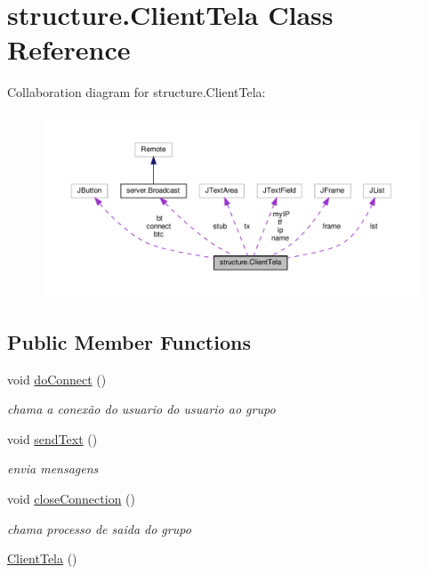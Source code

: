 \hypertarget{classstructure_1_1_client_tela}{}\section{structure.\+Client\+Tela Class Reference}
\label{classstructure_1_1_client_tela}


Collaboration diagram for structure.\+Client\+Tela\+:
\nopagebreak
\begin{figure}[H]
\begin{center}
\leavevmode
\includegraphics[width=350pt]{classstructure_1_1_client_tela__coll__graph}
\end{center}
\end{figure}
\subsection*{Public Member Functions}
\begin{DoxyCompactItemize}
\item 
void \hyperlink{classstructure_1_1_client_tela_a60fdbdd395b62d73b5bdeac95237fcc0}{do\+Connect} ()
\begin{DoxyCompactList}\small\item\em chama a conexão do usuario do usuario ao grupo \end{DoxyCompactList}\item 
void \hyperlink{classstructure_1_1_client_tela_a7b102bb8543266eed71ff94ac46fd815}{send\+Text} ()
\begin{DoxyCompactList}\small\item\em envia mensagens \end{DoxyCompactList}\item 
void \hyperlink{classstructure_1_1_client_tela_a7b9558eff45ebd37710065d2607329fb}{close\+Connection} ()
\begin{DoxyCompactList}\small\item\em chama processo de saida do grupo \end{DoxyCompactList}\item 
\hyperlink{classstructure_1_1_client_tela_a0f805fc16d6609f1063575f445ee5a56}{Client\+Tela} ()
\end{DoxyCompactItemize}
